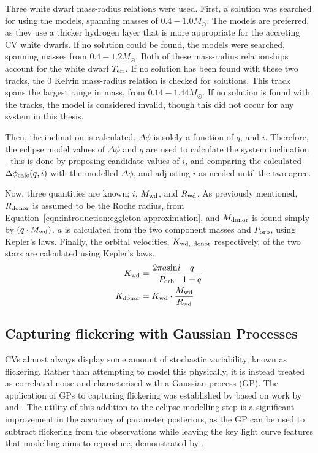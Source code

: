 Three white dwarf mass-radius relations were used. First, a solution was searched for using the \citet{wood1995} models, spanning masses of $0.4 - 1.0 M_\odot$. The \citet{wood1995} models are preferred, as they use a thicker hydrogen layer that is more appropriate for the accreting CV white dwarfs.
If no solution could be found, the \citet{panei2000} models were searched, spanning masses from $0.4 - 1.2 M_\odot$.
Both of these mass-radius relationships account for the white dwarf $T_{\rm eff}$.
If no solution has been found with these two tracks, the \citet{hamada1961} 0 Kelvin mass-radius relation is checked for solutions. This track spans the largest range in mass, from $0.14 - 1.44 M_\odot$. If no solution is found with the \citet{hamada1961} tracks, the model is considered invalid, though this did not occur for any system in this thesis.

Then, the inclination is calculated. $\Delta \phi$ is solely a function of $q$, and $i$. Therefore, the eclipse model values of $\Delta\phi$ and $q$ are used to calculate the system inclination - this is done by proposing candidate values of $i$, and comparing the calculated $\Delta \phi_{\rm calc}(q,i)$ with the modelled $\Delta \phi$, and adjusting $i$ as needed until the two agree.

Now, three quantities are known; $i$, $M_{\rm wd}$, and $R_{\rm wd}$. As previously mentioned, $R_{\rm donor}$ is assumed to be the Roche radius, from Equation~\ref{eqn:introduction:eggleton approximation}, and $M_{\rm donor}$ is found simply by $(q \cdot M_{\rm wd})$. $a$ is calculated from the two component masses and $P_{\rm orb}$, using Kepler's laws. Finally, the orbital velocities, $K_{\rm wd,\ donor}$ respectively, of the two stars are calculated using Kepler's laws.
\begin{align}
    K_{\rm wd} &= \frac{2\pi a \mathrm{sin}i}{P_{\rm orb}} \frac{q}{1+q} \\
    K_{\rm donor} &= K_{\rm wd} \cdot \frac{M_{\rm wd}}{R_{\rm wd}}
\end{align}


\subsection{Capturing flickering with Gaussian Processes}

CVs almost always display some amount of stochastic variability, known as flickering. Rather than attempting to model this physically, it is instead treated as correlated noise and characterised with a Gaussian process (GP).
The application of GPs to capturing flickering was established by \citet{mcallister2017} based on work by \citet{roberts2012} and \citet{gibson2012}.
The utility of this addition to the eclipse modelling step is a significant improvement in the accuracy of parameter posteriors, as the GP can be used to subtract flickering from the observations while leaving the key light curve features that modelling aims to reproduce, demonstrated by \citet{mcallister2017}.

